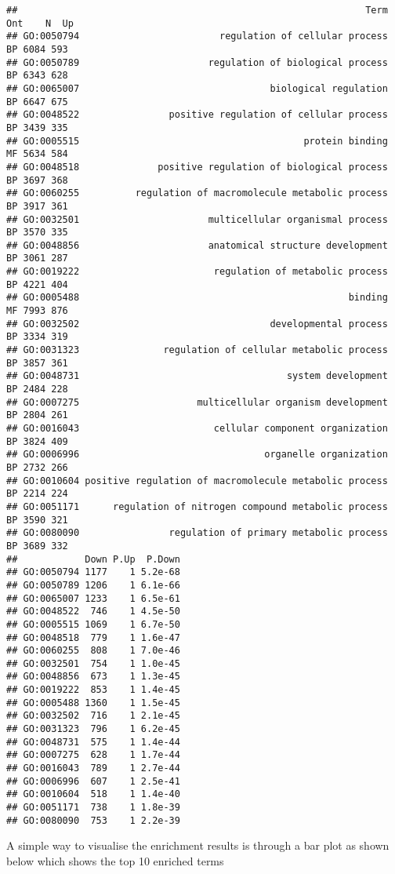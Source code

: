 \documentclass[]{book}
\begin{document}
\begin{verbatim}
##                                                              Term Ont    N  Up
## GO:0050794                         regulation of cellular process  BP 6084 593
## GO:0050789                       regulation of biological process  BP 6343 628
## GO:0065007                                  biological regulation  BP 6647 675
## GO:0048522                positive regulation of cellular process  BP 3439 335
## GO:0005515                                        protein binding  MF 5634 584
## GO:0048518              positive regulation of biological process  BP 3697 368
## GO:0060255          regulation of macromolecule metabolic process  BP 3917 361
## GO:0032501                       multicellular organismal process  BP 3570 335
## GO:0048856                       anatomical structure development  BP 3061 287
## GO:0019222                        regulation of metabolic process  BP 4221 404
## GO:0005488                                                binding  MF 7993 876
## GO:0032502                                  developmental process  BP 3334 319
## GO:0031323               regulation of cellular metabolic process  BP 3857 361
## GO:0048731                                     system development  BP 2484 228
## GO:0007275                     multicellular organism development  BP 2804 261
## GO:0016043                        cellular component organization  BP 3824 409
## GO:0006996                                 organelle organization  BP 2732 266
## GO:0010604 positive regulation of macromolecule metabolic process  BP 2214 224
## GO:0051171      regulation of nitrogen compound metabolic process  BP 3590 321
## GO:0080090                regulation of primary metabolic process  BP 3689 332
##            Down P.Up  P.Down
## GO:0050794 1177    1 5.2e-68
## GO:0050789 1206    1 6.1e-66
## GO:0065007 1233    1 6.5e-61
## GO:0048522  746    1 4.5e-50
## GO:0005515 1069    1 6.7e-50
## GO:0048518  779    1 1.6e-47
## GO:0060255  808    1 7.0e-46
## GO:0032501  754    1 1.0e-45
## GO:0048856  673    1 1.3e-45
## GO:0019222  853    1 1.4e-45
## GO:0005488 1360    1 1.5e-45
## GO:0032502  716    1 2.1e-45
## GO:0031323  796    1 6.2e-45
## GO:0048731  575    1 1.4e-44
## GO:0007275  628    1 1.7e-44
## GO:0016043  789    1 2.7e-44
## GO:0006996  607    1 2.5e-41
## GO:0010604  518    1 1.4e-40
## GO:0051171  738    1 1.8e-39
## GO:0080090  753    1 2.2e-39
\end{verbatim}

A simple way to visualise the enrichment results is through a bar plot as shown below which shows the top 10 enriched terms
\end{document}
